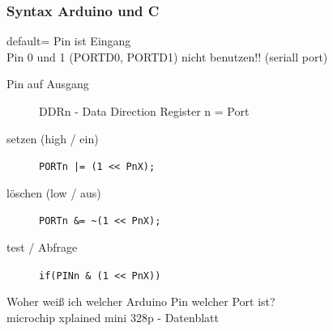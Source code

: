 \documentclass[aspectratio=169]{beamer}
\begin{document}
\begin{frame}[fragile]
    \frametitle{Syntax Arduino und C}
    default= Pin ist Eingang\\
    Pin 0 und 1 (PORTD0, PORTD1) nicht benutzen!! (seriall port)
    \pause
\begin{description}
    \item[Pin auf Ausgang] DDRn - Data Direction Register n = Port 
    \item[setzen (high / ein)] \lstinline!PORTn |= (1 << PnX);!
    \item[löschen (low / aus)] \lstinline!PORTn &= ~(1 << PnX);!
    \item[test / Abfrage] \lstinline!if(PINn & (1 << PnX))!
\end{description}
Woher weiß ich welcher Arduino Pin welcher Port ist?\\
microchip xplained mini 328p - Datenblatt
\end{frame}
\end{document}
